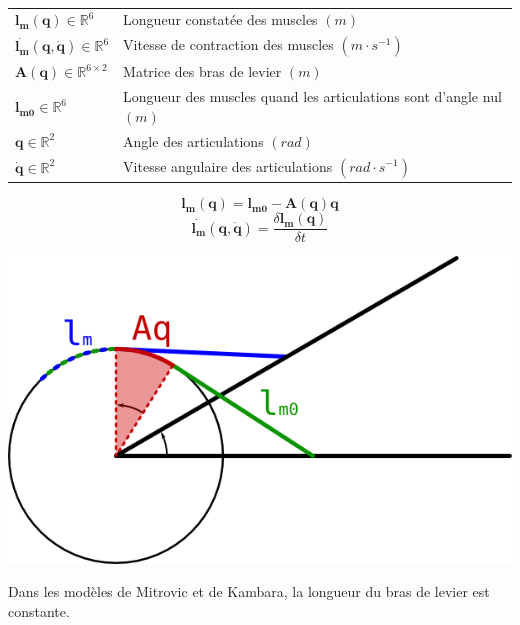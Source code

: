 \documentclass[pdftex,a4paper,11pt]{article}
\newcommand{\vs}[1]{\boldsymbol{#1}} %
\newcommand{\ms}[1]{\boldsymbol{#1}} %
\numberwithin{equation}{subsection}
\begin{document}
\paragraph{}
\begin{small}
\begin{tabular}{ll}
    $\vs{l_m}(\vs{q}) \in \mathbb{R}^6$                  & Longueur constatée des muscles $(m)$ \\
    $\vs{\dot{l_m}}(\vs{q}, \vs{\dot{q}}) \in \mathbb{R}^6$   & Vitesse de contraction des muscles $(m \cdot s^{-1})$ \\

    $\ms{A}(\vs{q}) \in \mathbb{R}^{6 \times 2}$   &  Matrice des bras de levier $(m)$\\
    $\vs{l_{m0}} \in \mathbb{R}^6$            &  Longueur des muscles quand les articulations sont d'angle nul $(m)$ \\
    $\vs{q} \in \mathbb{R}^2$                 &  Angle des articulations $(rad)$ \\
    $\vs{\dot{q}} \in \mathbb{R}^2$           &  Vitesse angulaire des articulations $(rad \cdot s^{-1})$ \\
\end{tabular}
\end{small}

\[\vs{l_m}(\vs{q}) = \vs{l_{m0}} - \ms{A}(\vs{q}) \vs{q}\]
\[\vs{\dot{l_m}}(\vs{q}, \vs{\dot{q}}) = \frac{\delta \vs{l_m}(\vs{q})}{\delta t}\]

\begin{center}
        \includegraphics[width=.50\linewidth]{fig/muscle_length}
\end{center}

Dans les modèles de Mitrovic et de Kambara, la longueur du bras de levier est constante.%
    
\end{document}

